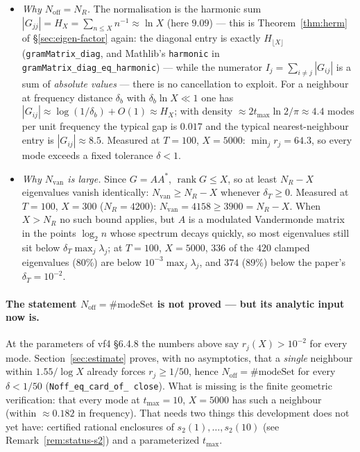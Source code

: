 \documentclass[11pt,a4paper]{article}
\newcommand{\lb}{\_\allowbreak}
\newcommand{\code}[1]{\texttt{#1}}
\newcommand{\itemization}[1]{\begin{itemize}[leftmargin=1.4em,itemsep=1pt,topsep=2pt]#1\end{itemize}}
\theoremstyle{definition}
\theoremstyle{remark}
\begin{document}
\itemization{
\item \emph{Why $N_{\mathrm{off}}=N_R$.}  The normalisation is the harmonic sum
  $|G_{jj}|=H_X=\sum_{n\le X}n^{-1}\approx\ln X$ (here $9.09$) --- this is
  Theorem~\ref{thm:herm} of \S\ref{sec:eigen-factor} again: the diagonal entry is exactly
  $H_{\lfloor X\rfloor}$ (\code{gramMatrix\lb diag}, and Mathlib's \code{harmonic} in
  \code{gramMatrix\lb diag\lb eq\lb harmonic}) --- while the numerator
  $I_j=\sum_{i\ne j}|G_{ij}|$ is a sum of \emph{absolute values} --- there is no cancellation
  to exploit.  For a neighbour at frequency distance $\delta_b$ with
  $\delta_b\ln X\ll1$ one has $|G_{ij}|\approx\log(1/\delta_b)+O(1)\approx H_X$; with density
  $\approx2t_{\max}\ln2/\pi\approx4.4$ modes per unit frequency the typical gap is $0.017$
  and the typical nearest-neighbour entry is $|G_{ij}|\approx8.5$.  Measured at
  $T=100$, $X=5000$: $\min_j r_j=64.3$, so every mode exceeds a fixed tolerance
  $\delta<1$.
\item \emph{Why $N_{\mathrm{van}}$ is large.}  Since $G=AA^{*}$, $\operatorname{rank}G\le X$,
  so at least $N_R-X$ eigenvalues vanish identically: $N_{\mathrm{van}}\ge N_R-X$ whenever
  $\delta_T\ge0$.  Measured at $T=100$, $X=300$ ($N_R=4200$): $N_{\mathrm{van}}=4158\ge3900
  =N_R-X$.  When $X>N_R$ no such bound applies, but $A$ is a modulated Vandermonde matrix
  in the points $\log_2 n$ whose spectrum decays quickly, so most eigenvalues still sit below
  $\delta_T\max_j\lambda_j$; at $T=100$, $X=5000$, $336$ of the $420$ clamped eigenvalues
  (80\%) are below $10^{-3}\max_j\lambda_j$, and $374$ (89\%) below the paper's
  $\delta_T=10^{-2}$.
}

\paragraph{The statement $N_{\mathrm{off}}=\#\mathrm{modeSet}$ is not proved --- but its analytic
input now is.}  At the parameters of vf4 \S6.4.8 the numbers above say $r_j(X)>10^{-2}$ for
every mode.  Section~\ref{sec:estimate} proves, with no asymptotics, that a \emph{single}
neighbour within $1.55/\log X$ already forces $r_j\ge1/50$, hence
$N_{\mathrm{off}}=\#\mathrm{modeSet}$ for every $\delta<1/50$ (\code{Noff\lb eq\lb card\lb of\lb
close}).  What is missing is the finite geometric verification: that every mode at
$t_{\max}=10$, $X=5000$ has such a neighbour (within $\approx0.182$ in frequency).  That needs
two things this development does not yet have: certified rational enclosures of
$s_2(1),\dots,s_2(10)$ (see Remark~\ref{rem:status-s2}) and a parameterized $t_{\max}$.
\end{document}

